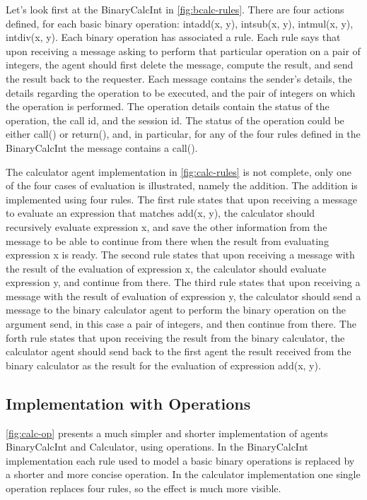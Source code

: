 \documentclass[a4paper,12pt,oneside,fleqn]{book} %
\begin{document}
Let's look first at the BinaryCalcInt in \autoref{fig:bcalc-rules}. There
are four actions defined, for each basic binary operation: intadd(x, y),
intsub(x, y), intmul(x, y), intdiv(x, y). Each binary operation has
associated a rule. Each rule says that upon receiving a message asking to
perform that particular operation on a pair of integers, the agent should
first delete the message, compute the result, and send the result back to
the requester.  Each message contains the sender's details, the details
regarding the operation to be executed, and the pair of integers on which
the operation is performed. The operation details contain the status of the
operation, the call id, and the session id. The status of the operation
could be either call() or return(), and, in particular, for any of the four
rules defined in the BinaryCalcInt the message contains a call().

The calculator agent implementation in \autoref{fig:calc-rules} is not
complete, only one of the four cases of evaluation is illustrated, namely
the addition. The addition is implemented using four rules. The first rule
states that upon receiving a message to evaluate an expression that matches
add(x, y), the calculator should recursively evaluate expression x, and save
the other information from the message to be able to continue from there when
the result from evaluating expression x is ready. The second rule states
that upon receiving a message with the result of the evaluation of
expression x, the calculator should evaluate expression y, and continue
from there. The third rule states that upon receiving a message with the
result of evaluation of expression y, the calculator should send a message
to the binary calculator agent to perform the binary operation on the
argument send, in this case a pair of integers, and then continue from
there. The forth rule states that upon receiving the result from the
binary calculator, the calculator agent should send back to the first agent
the result received from the binary calculator as the result for the
evaluation of expression add(x, y).
\subsection{Implementation with Operations} %
\autoref{fig:calc-op} presents a much simpler and shorter implementation of
agents BinaryCalcInt and Calculator, using operations. In the BinaryCalcInt
implementation each rule used to model a basic binary operations is
replaced by a shorter and more concise operation. In the calculator
implementation one single operation replaces four rules, so the effect is
much more visible.
\end{document}
